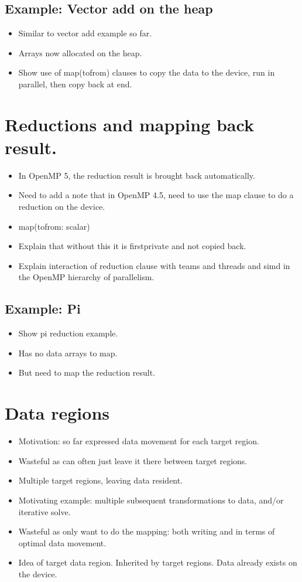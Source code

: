 \subsection{Example: Vector add on the heap}
\begin{itemize}
  \item Similar to vector add example so far.
  \item Arrays now allocated on the heap.
  \item Show use of map(tofrom) clauses to copy the data to the device, run in parallel, then copy back at end.
\end{itemize}

\section{Reductions and mapping back result.}
\label{sec:target_reductions}
\begin{itemize}
  \item In OpenMP 5, the reduction result is brought back automatically.
  \item Need to add a note that in OpenMP 4.5, need to use the map clause to do a reduction on the device.
  \item map(tofrom: scalar)
  \item Explain that without this it is firstprivate and not copied back.
  \item Explain interaction of reduction clause with teams and threads and simd in the OpenMP hierarchy of parallelism.
\end{itemize}

\subsection{Example: Pi}
\begin{itemize}
  \item Show pi reduction example.
  \item Has no data arrays to map.
  \item But need to map the reduction result.
\end{itemize}

\section{Data regions}
\begin{itemize}
  \item Motivation: so far expressed data movement for each target region.
  \item Wasteful as can often just leave it there between target regions.
  \item Multiple target regions, leaving data resident.
  \item Motivating example: multiple subsequent transformations to data, and/or iterative solve.
  \item Wasteful as only want to do the mapping: both writing and in terms of optimal data movement.
  \item Idea of target data region. Inherited by target regions. Data already exists on the device.
\end{itemize}

